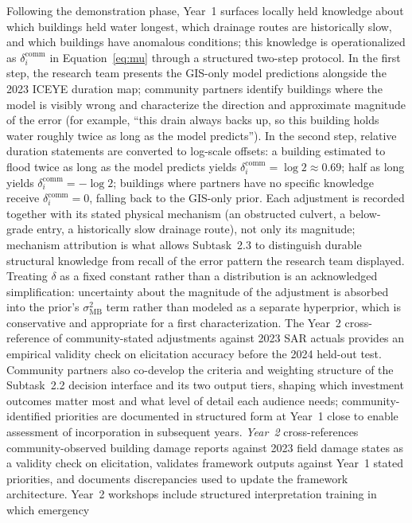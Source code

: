 \documentclass[11pt]{article}
\begin{document}
Following the demonstration phase, Year~1 surfaces locally held knowledge about which
buildings held water longest, which drainage routes are historically slow, and which
buildings have anomalous conditions; this knowledge is operationalized as
$\delta_i^{\mathrm{comm}}$ in Equation~\eqref{eq:mu} through a structured two-step protocol.
In the first step, the research team presents the GIS-only model predictions alongside
the 2023 ICEYE duration map; community partners identify buildings where the model is
visibly wrong and characterize the direction and approximate magnitude of the error
(for example, ``this drain always backs up, so this building holds water roughly twice
as long as the model predicts'').
In the second step, relative duration statements are converted to log-scale offsets:
a building estimated to flood twice as long as the model predicts yields
$\delta_i^{\mathrm{comm}} = \log 2 \approx 0.69$; half as long yields
$\delta_i^{\mathrm{comm}} = -\log 2$; buildings where partners have no specific
knowledge receive $\delta_i^{\mathrm{comm}} = 0$, falling back to the GIS-only prior.
Each adjustment is recorded together with its stated physical mechanism (an
obstructed culvert, a below-grade entry, a historically slow drainage route),
not only its magnitude; mechanism attribution is what allows Subtask~2.3 to
distinguish durable structural knowledge from recall of the error pattern the
research team displayed.
Treating $\delta$ as a fixed constant rather than a distribution is an acknowledged
simplification: uncertainty about the magnitude of the adjustment is absorbed into
the prior's $\sigma_{\mathrm{MB}}^2$ term rather than modeled as a separate hyperprior, which
is conservative and appropriate for a first characterization.
The Year~2 cross-reference of community-stated adjustments against 2023 SAR actuals
provides an empirical validity check on elicitation accuracy before the 2024 held-out
test.
Community partners also co-develop the criteria and weighting structure of the
Subtask~2.2 decision interface and its two output tiers, shaping which investment
outcomes matter most and what level of detail each audience needs; community-identified
priorities are documented in structured form at Year~1 close to enable assessment
of incorporation in subsequent years.
\textit{Year~2} cross-references community-observed building damage reports against
2023 field damage states as a validity check on elicitation, validates framework
outputs against Year~1 stated priorities, and documents discrepancies used to update
the framework architecture.
Year~2 workshops include structured interpretation training in which emergency
\end{document}
